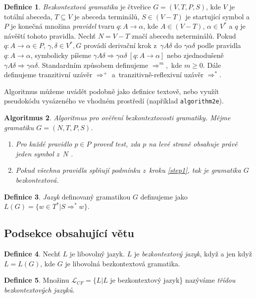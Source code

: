 \documentclass[a4paper, 11pt, twocolumn]{article}
\theoremstyle{definition}
\newtheorem{defn}{Definice}[section]
\theoremstyle{plain}
\newtheorem{alg}[defn]{Algoritmus}
\theoremstyle{plain}
\begin{document}
	\begin{defn}\label{1.1}
		\emph{Bezkontextová gramatika} je čtveřice $G=(V,T,P,S)$, kde $V$ je totální abeceda, $T \subseteq V$ je abeceda terminálů, $S \in (V-T)$ je startující symbol a $P$ je konečná množina \emph{pravidel} tvaru $q\!: A \rightarrow \alpha$, kde $A \in (V-T)$, $\alpha \in V^*$ a $q$ je návěští tohoto pravidla. Nechť $N=V-T$ značí abecedu neterminálů.
		Pokud ${q\!: A \rightarrow \alpha \in P}$, ${\gamma ,\delta \in V^*, G}$ provádí derivační krok z~$\gamma A \delta$ do $\gamma \alpha \delta$ podle pravidla $q\!: A \rightarrow \alpha$, symbolicky píšeme 
		$\gamma A \delta \Rightarrow \gamma \alpha \delta\ [q\!: A \rightarrow \alpha]$ nebo zjednodušeně $\gamma A\delta \Rightarrow \gamma \alpha \delta$. Standardním způsobem definujeme $\Rightarrow^m$,~kde $m\ge 0$. Dále definujeme 
		tranzitivní uzávěr $\Rightarrow^+$ a~tranzitivně-reflexivní uzávěr $\Rightarrow^*$.
	\end{defn}
	
	Algoritmus můžeme uvádět podobně jako definice textově, nebo využít pseudokódu vysázeného ve vhodném prostředí (například \texttt{algorithm2e}).

	\begin{alg} Algoritmus pro ověření bezkontextovosti gramatiky. Mějme gramatiku $G = (N, T, P, S)$.
	\begin{enumerate}
		 \item\label{step1} Pro každé pravidlo $p \in P$ proveď test, zda $p$ na levé straně obsahuje právě jeden symbol z~$N$ .
		 \item Pokud všechna pravidla splňují podmínku z~kroku \ref{step1}, tak je gramatika $G$ bezkontextová.
	\end{enumerate}
	\end{alg}
	\begin{defn}
		\emph{Jazyk} definovaný gramatikou $G$ definujeme jako $L(G)=\{w \in T^*|S \Rightarrow^* w\}$.
	\end{defn}
	
	\subsection{Podsekce obsahující větu}
	
	\begin{defn}
		Nechť $L$ je libovolný jazyk. $L$ je \emph{bezkontextový jazyk}, když a jen když $L=L(G)$, kde $G$ je libovolná bezkontextová gramatika.	
	\end{defn}
	\begin{defn}
		Množinu $\mathcal{L}_{CF}=\{L|L$ je bezkontextový jazyk\} nazýváme \emph{třídou bezkontextových jazyků}.
	\end{defn}
	
\end{document}
